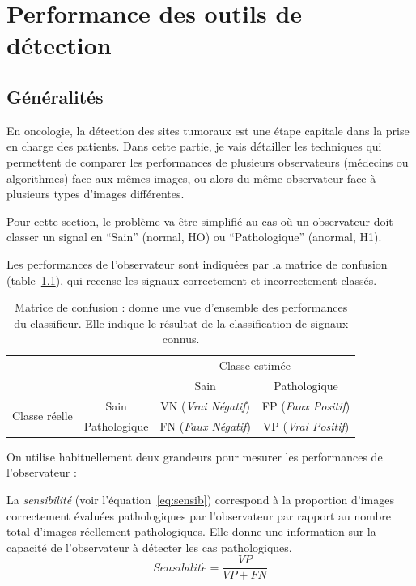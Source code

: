 \chapter{Performance des outils de détection}
\label{lab:chapCAD}
	\section{Généralités}

En oncologie, la détection des sites tumoraux est une étape capitale dans la prise en charge des patients. 
Dans cette partie, je vais détailler les techniques qui permettent de comparer les performances de plusieurs observateurs (médecins ou algorithmes) face aux mêmes images, ou alors du même observateur face à plusieurs types d'images différentes.

Pour cette section, le problème va être simplifié au cas où un observateur doit classer un signal en ``Sain'' (normal, HO) ou ``Pathologique'' (anormal, H1). 

Les performances de l'observateur sont indiquées par la matrice de confusion (table~\ref{tab:confusion}), qui recense les signaux correctement et incorrectement classés.

\begin{table}[h]
	\label{tab:confusion}
	\begin{tabular}{cc c|c|}
		& & \multicolumn{2}{c}{Classe estimée} \\
		\cline{3-4}	
		& & \multicolumn{1}{|c|}{Sain} & Pathologique \\ 
		\cline{2-4}
		\multicolumn{1}{c|}{\multirow{2}{*}{Classe réelle}} & \multicolumn{1}{|c|}{Sain} & VN (\emph{Vrai Négatif}) & FP (\emph{Faux Positif})\\
		\cline{2-4}
		\multicolumn{1}{c|}{} & \multicolumn{1}{|c|}{Pathologique} & FN (\emph{Faux Négatif}) & VP (\emph{Vrai Positif})\\
		\cline{2-4}
	\end{tabular}
	\caption[Matrice de confusion]{Matrice de confusion : donne une vue
d'ensemble des performances du classifieur. Elle indique le résultat de la
classification de signaux connus.}
\end{table}

On utilise habituellement deux grandeurs pour mesurer les performances de l'observateur :

La \emph{sensibilité} (voir l'équation~\ref{eq:sensib}) correspond à la proportion d'images correctement évaluées pathologiques par l'observateur par rapport au nombre total d'images réellement pathologiques. Elle donne une information sur la capacité de l'observateur à détecter les cas pathologiques.
\label{lab:pressensib}
\begin{equation}
	\label{eq:sensib}
	Sensibilit\acute{e} = \frac{VP}{VP + FN}
\end{equation}


